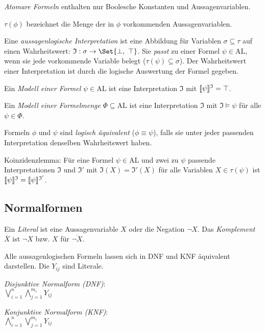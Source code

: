 \documentclass{panikzettel}
\newcommand{\AL}{\mathrm{AL}}
\DeclarePairedDelimiter\interpret{\llbracket}{\rrbracket}
\newcommand{\J}{\mathfrak{I}}
\begin{document}
\emph{Atomare Formeln} enthalten nur Boolesche Konstanten und Aussagenvariablen.

$\tau(\phi)$ bezeichnet die Menge der in $\phi$ vorkommenden Aussagenvariablen.

Eine \emph{aussagenlogische Interpretation} ist eine Abbildung für Variablen $\sigma \subseteq \tau$ auf einen Wahrheitswert: $\J : \sigma \to \Set{\bot,\ \top}$. Sie \emph{passt} zu einer Formel $\psi \in \AL$, wenn sie jede vorkommende Variable belegt ($\tau(\psi) \subseteq \sigma$).
Der Wahrheitswert einer Interpretation ist durch die logische Auswertung der Formel gegeben.

Ein \emph{Modell einer Formel} $\psi \in \AL$ ist eine Interpretation $\J$ mit $\interpret{\psi}^\J = \top$.

Ein \emph{Modell einer Formelmenge} $\Phi \subseteq \AL$ ist eine Interpretation $\J$ mit $\J \models \psi$ für alle $\psi \in \Phi$.

Formeln $\phi$ und $\psi$ sind \emph{logisch äquivalent} ($\phi \equiv \psi$), falls sie unter jeder passenden Interpretation denselben Wahrheitswert haben.

Koinzidenzlemma: Für eine Formel $\psi \in \AL$ und zwei zu $\psi$ passende Interpretationen $\J$ und $\J'$ mit $\J(X) = \J'(X)$ für alle Variablen $X \in \tau(\psi)$ ist $\interpret{\psi}^\J = \interpret{\psi}^{\J'}$.

\subsection{Normalformen}

Ein \emph{Literal} ist eine Aussagenvariable $X$ oder die Negation $\neg X$. Das \emph{Komplement} $\overline{X}$ ist $\neg X$ bzw. $X$ für $\overline{\neg X}$.

Alle aussagenlogischen Formeln lassen sich in DNF und KNF äquivalent darstellen. Die $Y_{ij}$ sind Literale.

\begin{minipage}[t]{0.5\textwidth}
\begin{center}
\emph{Disjunktive Normalform (DNF)}: \\
$\bigvee_{i=1}^n \bigwedge_{j=1}^{m_i} Y_{ij}$
\end{center}
\end{minipage}
\begin{minipage}[t]{0.5\textwidth}
\begin{center}
\emph{Konjunktive Normalform (KNF)}: \\
$\bigwedge_{i=1}^n \bigvee_{j=1}^{m_i} Y_{ij}$
\end{center}
\end{minipage}
\end{document}
